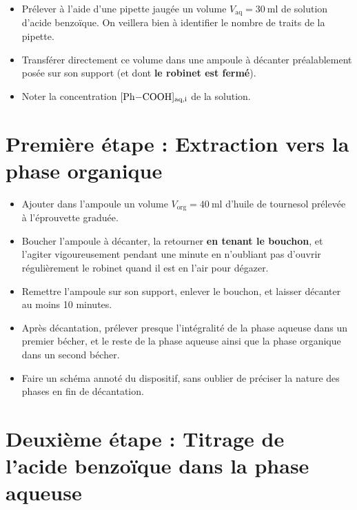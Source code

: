 \documentclass{tp}
\begin{document}
\begin{itemize}
  \item Prélever à l'aide d'une pipette jaugée un volume $V_\text{aq} = \SI{30}{\milli\litre}$ de solution d'acide benzoïque. On veillera bien à identifier le nombre de traits de la pipette.

  \item Transférer directement ce volume dans une ampoule à décanter préalablement posée sur son support (et dont \textbf{le robinet est fermé}).

  \item Noter la concentration $[\ce{Ph-COOH}]_\text{aq,i}$ de la solution. 
\end{itemize}

\section{Première étape : Extraction vers la phase organique}%
\label{sec:premiere_etape_extraction_vers_la_phase_organique}

\begin{itemize}
  \item Ajouter dans l'ampoule un volume $V_\text{org}=\SI{40}{\milli\litre}$ d'huile de tournesol prélevée à l'éprouvette graduée.

  \item Boucher l'ampoule à décanter, la retourner \textbf{en tenant le bouchon}, et l'agiter vigoureusement pendant une minute en n'oubliant pas d'ouvrir régulièrement le robinet quand il est en l'air pour dégazer.

  \item Remettre l'ampoule sur son support, enlever le bouchon, et laisser décanter au moins 10 minutes.

  \item Après décantation, prélever presque l'intégralité de la phase aqueuse dans un premier bécher, et le reste de la phase aqueuse ainsi que la phase organique dans un second bécher.

  \item Faire un schéma annoté du dispositif, sans oublier de préciser la nature des phases en fin de décantation.
\end{itemize}

\section{Deuxième étape : Titrage de l'acide benzoïque dans la phase aqueuse}%
\label{sec:deuxieme_etape_titrage_de_l_acide_benzoique_dans_la_phase_aqueuse}
\end{document}

